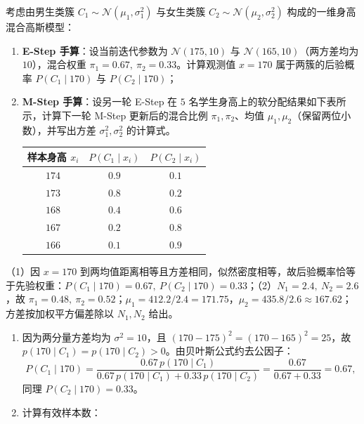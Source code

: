 \begin{exercise}[title={一维混合高斯模型 EM 算法的 E-Step 与 M-Step 手算},level=standard,points=18,tags={EM算法,GMM,软聚类,手算}]
考虑由男生类簇 $C_1\sim\mathcal{N}(\mu_1, \sigma_1^2)$ 与女生类簇 $C_2\sim\mathcal{N}(\mu_2, \sigma_2^2)$ 构成的一维身高混合高斯模型：
\begin{enumerate}
  \item \textbf{E-Step 手算}：设当前迭代参数为 $\mathcal{N}(175, 10)$ 与 $\mathcal{N}(165, 10)$（两方差均为 $10$），混合权重 $\pi_1 = 0.67,\ \pi_2 = 0.33$。计算观测值 $x = 170$ 属于两簇的后验概率 $P(C_1\mid 170)$ 与 $P(C_2\mid 170)$；
  \item \textbf{M-Step 手算}：设另一轮 E-Step 在 $5$ 名学生身高上的软分配结果如下表所示，计算下一轮 M-Step 更新后的混合比例 $\pi_1, \pi_2$、均值 $\mu_1, \mu_2$（保留两位小数），并写出方差 $\sigma_1^2, \sigma_2^2$ 的计算式。
  \begin{center}
    \small
    \begin{tabular}{@{}ccc@{}}
      \toprule
      样本身高 $x_i$ & $P(C_1\mid x_i)$ & $P(C_2\mid x_i)$ \\
      \midrule
      $174$ & $0.9$ & $0.1$ \\
      $173$ & $0.8$ & $0.2$ \\
      $168$ & $0.4$ & $0.6$ \\
      $167$ & $0.2$ & $0.8$ \\
      $166$ & $0.1$ & $0.9$ \\
      \bottomrule
    \end{tabular}
  \end{center}
\end{enumerate}
\begin{answer}
（1）因 $x=170$ 到两均值距离相等且方差相同，似然密度相等，故后验概率恰等于先验权重：$P(C_1\mid 170)=0.67,\ P(C_2\mid 170)=0.33$；（2）$N_1=2.4,\ N_2=2.6$，故 $\pi_1 = 0.48,\ \pi_2 = 0.52$；$\mu_1 = 412.2/2.4 = 171.75$，$\mu_2 = 435.8/2.6 \approx 167.62$；方差按加权平方偏差除以 $N_1, N_2$ 给出。
\end{answer}
\begin{solution}
\begin{enumerate}
  \item 因为两分量方差均为 $\sigma^2 = 10$，且 $(170 - 175)^2 = (170 - 165)^2 = 25$，故 $p(170\mid C_1) = p(170\mid C_2) > 0$。由贝叶斯公式约去公因子：
  \[
    P(C_1\mid 170) = \frac{0.67\,p(170\mid C_1)}{0.67\,p(170\mid C_1) + 0.33\,p(170\mid C_2)} = \frac{0.67}{0.67+0.33} = 0.67,
  \]
  同理 $P(C_2\mid 170) = 0.33$。
  \item 计算有效样本数：

\end{enumerate}
\end{solution}
\end{exercise}
